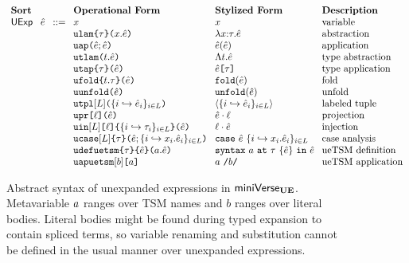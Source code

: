 \begin{figure}
\hspace{-6px}$\arraycolsep=4pt\begin{array}{lllllll}
\textbf{Sort} & & & \textbf{Operational Form} & \textbf{Stylized Form} & \textbf{Description}\\
\mathsf{UExp} & \ue & ::= & x & x & \text{variable}\\
&&& \aulam{\tau}{x}{\ue} & \lam{x}{\tau}{\ue} & \text{abstraction}\\
&&& \auap{\ue}{\ue} & \ap{\ue}{\ue} & \text{application}\\
&&& \autlam{t}{\ue} & \Lam{t}{\ue} & \text{type abstraction}\\
&&& \autap{\ue}{\tau} & \App{\ue}{\tau} & \text{type application}\\
&&& \aufold{t}{\tau}{\ue} & \fold{\ue} & \text{fold}\\
&&& \auunfold{\ue} & \unfold{\ue} & \text{unfold}\\
&&& \autpl{\labelset}{\mapschema{\ue}{i}{\labelset}} & \tpl{\mapschema{\ue}{i}{\labelset}} & \text{labeled tuple}\\
&&& \aupr{\ell}{\ue} & \prj{\ue}{\ell} & \text{projection}\\
&&& \auin{\labelset}{\ell}{\mapschema{\tau}{i}{\labelset}}{\ue} & \inj{\ell}{\ue} & \text{injection}\\
&&& \aucase{\labelset}{\tau}{\ue}{\mapschemab{x}{\ue}{i}{\labelset}} & \caseof{\ue}{\mapschemab{x}{\ue}{i}{\labelset}} & \text{case analysis}\\
&&& \audefuetsm{\tau}{\ue}{\tsmv}{\ue} & \uesyntax{\tsmv}{\tau}{\ue}{\ue} & \text{ueTSM definition}\\
&&& \autsmap{b}{\tsmv} & \utsmap{\tsmv}{b} & \text{ueTSM application}
\end{array}$
\caption[Syntax of unexpanded expressions in $\miniVerseUE$]{Abstract syntax of unexpanded expressions in $\miniVerseUE$. Metavariable $a$ ranges over TSM names and $b$ ranges over literal bodies. Literal bodies might be found during typed expansion to contain spliced terms, so variable renaming and substitution cannot be defined in the usual manner over unexpanded expressions.}
\label{fig:U-unexpanded-terms}
\end{figure}

